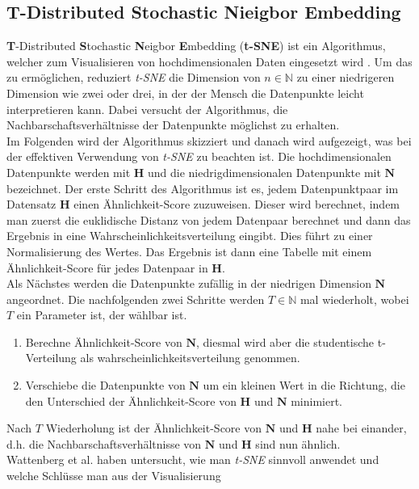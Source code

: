 \documentclass[12pt,letterpaper,ngerman]{article}
\begin{document}
\subsection{ T-Distributed Stochastic Nieigbor Embedding}
{\bf T}-Distributed {\bf S}tochastic {\bf N}eigbor {\bf E}mbedding
({\bf  t-SNE}) ist ein Algorithmus, welcher zum Visualisieren von
hochdimensionalen Daten eingesetzt wird
\cite{JMLR:v9:vandermaaten08a}. Um das zu ermöglichen,
reduziert  \textit{t-SNE} die Dimension von $n \in \mathbb{N}$ zu
einer niedrigeren Dimension wie zwei oder drei, in der der 
Mensch die Datenpunkte leicht interpretieren kann. Dabei versucht
der Algorithmus, die Nachbarschaftsverhältnisse der Datenpunkte
möglichst zu erhalten.\\
Im Folgenden wird der Algorithmus skizziert und danach wird aufgezeigt,
was bei der effektiven Verwendung von \textit{t-SNE} zu beachten ist. Die
hochdimensionalen Datenpunkte werden mit $\mathbf{H}$ und die 
niedrigdimensionalen Datenpunkte mit $\mathbf{N}$ bezeichnet. Der erste Schritt 
des Algorithmus ist es, jedem Datenpunktpaar im Datensatz $\mathbf{H}$
einen Ähnlichkeit-Score zuzuweisen. Dieser wird berechnet, indem man 
zuerst die euklidische Distanz von jedem Datenpaar berechnet und dann das 
Ergebnis in eine Wahrscheinlichkeitsverteilung eingibt. Dies führt zu
einer Normalisierung des Wertes. Das Ergebnis ist dann eine Tabelle mit 
einem Ähnlichkeit-Score für jedes Datenpaar in $\mathbf{H}$.\\
Als Nächstes werden die Datenpunkte zufällig in der niedrigen Dimension 
$\mathbf{N}$ angeordnet. Die nachfolgenden zwei Schritte werden 
$T\in \mathbb{N}$ 
mal wiederholt, wobei $T$ ein Parameter ist, der wählbar ist.
\begin{enumerate}
  \item Berechne Ähnlichkeit-Score von $\mathbf{N}$, diesmal wird aber die
      studentische t-Verteilung als wahrscheinlichkeitsverteilung genommen. 
  \item Verschiebe die Datenpunkte von $\mathbf{N}$ um ein kleinen Wert in
    die Richtung, die den Unterschied der Ähnlichkeit-Score von $\mathbf{H}$
    und $\mathbf{N}$ minimiert.
\end{enumerate}
Nach $T$ Wiederholung ist der Ähnlichkeit-Score von $\mathbf{N}$ und 
$\mathbf{H}$ nahe bei einander, d.h. die Nachbarschaftsverhältnisse 
von $\mathbf{N}$ und $\mathbf{H}$ sind nun ähnlich.\\
Wattenberg et al. haben untersucht, wie man  \textit{t-SNE} sinnvoll
anwendet und welche Schlüsse man aus der Visualisierung 
\end{document}
